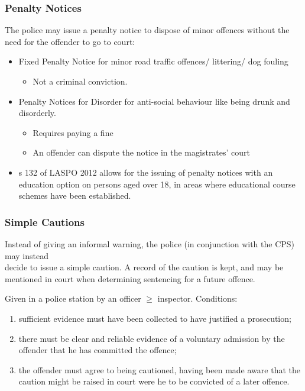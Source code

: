 \documentclass[
]{article}
\providecommand{\tightlist}{%
  \setlength{\itemsep}{0pt}\setlength{\parskip}{0pt}}
\begin{document}
\hypertarget{penalty-notices}{%
\subsubsection{Penalty Notices}\label{penalty-notices}}

The police may issue a penalty notice to dispose of minor offences
without the need for the offender to go to court:

\begin{itemize}
\tightlist
\item
  Fixed Penalty Notice for minor road traffic offences/ littering/ dog
  fouling

  \begin{itemize}
  \tightlist
  \item
    Not a criminal conviction.
  \end{itemize}
\item
  Penalty Notices for Disorder for anti-social behaviour like being
  drunk and disorderly.

  \begin{itemize}
  \tightlist
  \item
    Requires paying a fine
  \item
    An offender can dispute the notice in the magistrates' court
  \end{itemize}
\item
  s 132 of LASPO 2012 allows for the issuing of penalty notices with an
  education option on persons aged over 18, in areas where educational
  course schemes have been established.
\end{itemize}

\hypertarget{simple-cautions}{%
\subsubsection{Simple Cautions}\label{simple-cautions}}

Instead of giving an informal warning, the police (in conjunction with
the CPS) may instead\\
decide to issue a simple caution. A record of the caution is kept, and
may be mentioned in court when determining sentencing for a future
offence.

Given in a police station by an officer \(\geq\) inspector. Conditions:

\begin{enumerate}
\def\labelenumi{\arabic{enumi}.}
\tightlist
\item
  sufficient evidence must have been collected to have justified a
  prosecution;
\item
  there must be clear and reliable evidence of a voluntary admission by
  the offender that he has committed the offence;
\item
  the offender must agree to being cautioned, having been made aware
  that the caution might be raised in court were he to be convicted of a
  later offence.
\end{enumerate}
\end{document}
